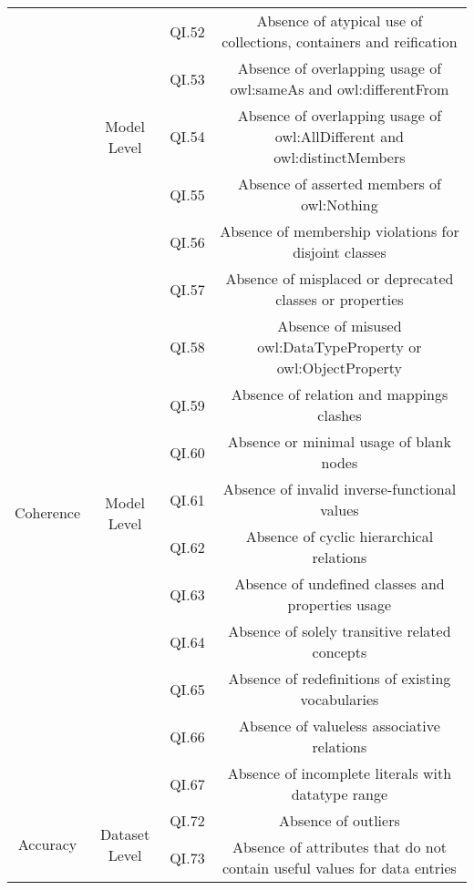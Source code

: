 \documentclass[onecolumn, crcready]{iosart2c}
\begin{document}
\begin{landscape}
\begin{center}
{\begin{longtable}[h]{|c|c|c|c|}
\cline{2-4}
 & \multirow{5}{*}{Model Level} & QI.52 & Absence of atypical use of collections, containers and reification \cite{Hogan2010}\tabularnewline
\cline{3-4}
 &  & QI.53 & Absence of overlapping usage of owl:sameAs and owl:differentFrom  \cite{Hogan2010}\tabularnewline
\cline{3-4}
 &  & QI.54 & Absence of overlapping usage of owl:AllDifferent and owl:distinctMembers  \cite{Hogan2010}\tabularnewline
\cline{3-4}
 &  & QI.55 & Absence of asserted members of owl:Nothing  \cite{Hogan2010}\tabularnewline
\cline{3-4}
 &  & QI.56 & Absence of membership violations for disjoint classes  \cite{Hogan2010}\tabularnewline
\hline
\hline
\multirow{10}{*}{Coherence} & \multirow{10}{*}{Model Level} & QI.57 & Absence of misplaced or deprecated classes or properties  \cite{Hogan2010}\tabularnewline
\cline{3-4}
 &  & QI.58 & Absence of misused owl:DataTypeProperty or owl:ObjectProperty  \cite{Hogan2010}\tabularnewline
\cline{3-4}
 &  & QI.59 & Absence of relation and mappings clashes  \cite{Suominen:2012:IQS:2413941.2413985}\tabularnewline
\cline{3-4}
 &  & QI.60 & Absence or minimal usage of blank nodes \cite{Hogan:2012:ESL:2263498.2264570}\tabularnewline
\cline{3-4}
 &  & QI.61 & Absence of invalid inverse-functional values \cite{Hogan2010}\tabularnewline
\cline{3-4}
 &  & QI.62 & Absence of cyclic hierarchical relations \cite{conf/jcdl/Soergel05}\cite{Suominen:2012:IQS:2413941.2413985}\cite{Mader2012}\tabularnewline
\cline{3-4}
 &  & QI.63 & Absence of undefined classes and properties usage \cite{Hogan2010}\tabularnewline
\cline{3-4}
 &  & QI.64 & Absence of solely transitive related concepts \cite{Mader2012}\tabularnewline
\cline{3-4}
 &  & QI.65 & Absence of redefinitions of existing vocabularies  \cite{Hogan2010}\tabularnewline
\cline{3-4}
 &  & QI.66 & Absence of valueless associative relations  \cite{Mader2012}\tabularnewline
\cline{3-4}
 &  & QI.67 & Absence of incomplete literals with datatype range \cite{Hogan2010}\tabularnewline
\hline
\hline
\multirow{2}{*}{Accuracy} & \multirow{2}{*}{Dataset Level} & QI.72 & Absence of outliers \cite{Framework2012}\tabularnewline
\cline{3-4}
 &  & QI.73 & Absence of attributes that do not contain useful values for data entries \cite{Framework2012}\tabularnewline

\end{longtable}}
\end{center}
\end{landscape}
\end{document}
